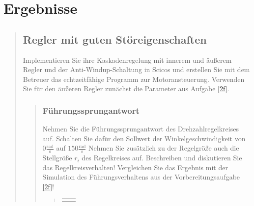 \section{Ergebnisse}
\begin{quote}
    
    
    \subsection{Regler mit guten Störeigenschaften}
    Implementieren Sie ihre Kaskadenregelung mit innerem und äußerem Regler und der
    Anti-Windup-Schaltung in Scicos und erstellen Sie mit dem Betreuer das echtzeitfähige
    Programm zur Motoransteuerung. Verwenden Sie für den äußeren Regler zunächst die
    Parameter aus Aufgabe \ref{2f}.
    
    
    \begin{quote}
        
        \subsubsection{Führungssprungantwort}
        Nehmen Sie die Führungssprungantwort des Drehzahlregelkreises auf. Schalten Sie
        dafür den Sollwert der Winkelgeschwindigkeit von $0 \mathrm{\frac{rad}{s}}$ auf $150 \mathrm{\frac{rad}{s}}$
        Nehmen Sie zusätzlich zu der Regelgröße auch die Stellgröße $r_i$ des Regelkreises auf.
        Beschreiben und diskutieren Sie das Regelkreisverhalten! Vergleichen Sie das Ergebnis mit der Simulation des
        Führungsverhaltens aus der Vorbereitungsaufgabe \ref{2f}!
        
        \begin{quote}
            
        \begin{center}
        \begin{tabular}{ll}
        
        \hspace{-4.5cm}
            \begin{minipage}{0.6\textwidth}
                

\end{minipage}
\end{tabular}
\end{center}
\end{quote}
\end{quote}
\end{quote}
